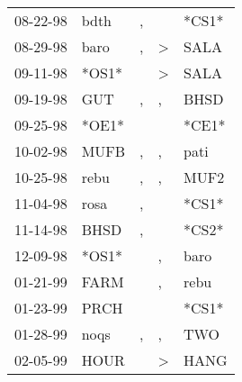 \begin{supertabular}{p{0.07\textwidth}p{0.06\textwidth}p{0.02\textwidth}p{0.02\textwidth}p{0.06\textwidth}}
          08-22-98\textsuperscript{} &           bdth\textsuperscript{} &                , &                  &                            *CS1* \\
          08-29-98\textsuperscript{} &           baro\textsuperscript{} &                , &     \textgreater &           SALA\textsuperscript{} \\
          09-11-98\textsuperscript{} &                            *OS1* &                  &     \textgreater &           SALA\textsuperscript{} \\
          09-19-98\textsuperscript{} &            GUT\textsuperscript{} &                , &                , &           BHSD\textsuperscript{} \\
          09-25-98\textsuperscript{} &                            *OE1* &                  &                  &                            *CE1* \\
          10-02-98\textsuperscript{} &           MUFB\textsuperscript{} &                , &                , &           pati\textsuperscript{} \\
          10-25-98\textsuperscript{} &           rebu\textsuperscript{} &                , &                , &           MUF2\textsuperscript{} \\
          11-04-98\textsuperscript{} &           rosa\textsuperscript{} &                , &                  &                            *CS1* \\
          11-14-98\textsuperscript{} &           BHSD\textsuperscript{} &                , &                  &                            *CS2* \\
          12-09-98\textsuperscript{} &                            *OS1* &                  &                , &           baro\textsuperscript{} \\
          01-21-99\textsuperscript{} &           FARM\textsuperscript{} &                  &                , &           rebu\textsuperscript{} \\
          01-23-99\textsuperscript{} &           PRCH\textsuperscript{} &                  &                  &                            *CS1* \\
          01-28-99\textsuperscript{} &           noqs\textsuperscript{} &                , &                , &            TWO\textsuperscript{} \\
          02-05-99\textsuperscript{} &           HOUR\textsuperscript{} &                  &     \textgreater &           HANG\textsuperscript{} \\

\end{supertabular}
